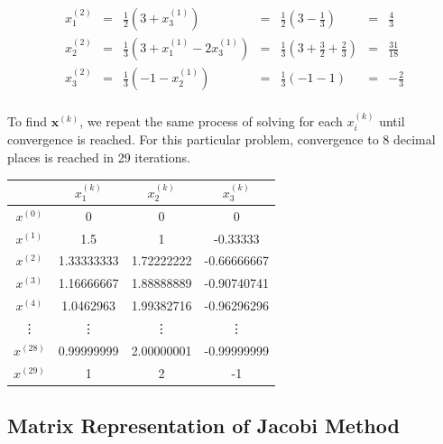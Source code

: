 $$
\begin{matrix}
x^{(2)}_1 & = & \frac{1}{2} ( 3 + x^{(1)}_3)  & = & \frac{1}{2} (3 - \frac{1}{3})     & = & \frac{4}{3} \\
x^{(2)}_2 & = & \frac{1}{3} ( 3 + x^{(1)}_1 - 2x^{(1)}_3) & = & \frac{1}{3} (3 + \frac{3}{2} + \frac{2}{3}) & = &  \frac{31}{18} \\
x^{(2)}_3 & = & \frac{1}{3} ( -1 - x^{(1)}_2)       & = & \frac{1}{3} (-1 - 1)    & = & -\frac{2}{3} \\
\end{matrix}
$$

To find $\mathbf{x}^{(k)}$, we repeat the same process of solving for each
$x^{(k)}_i$ until convergence is reached. For this particular problem,
convergence to 8 decimal places is reached in 29 iterations.

\begin{center}
\begin{tabular}{ c|c c c  }
          & $x^{(k)}_1$ & $x^{(k)}_2$ & $x^{(k)}_3$ \\
    \hline
    $x^{(0)}$ & 0 & 0 & 0 \\
    $x^{(1)}$ & 1.5 & 1 & -0.33333 \\
    $x^{(2)}$ & 1.33333333 & 1.72222222 & -0.66666667 \\
    $x^{(3)}$ & 1.16666667 & 1.88888889 & -0.90740741 \\
    $x^{(4)}$ & 1.0462963 & 1.99382716 & -0.96296296 \\
    \vdots    & \vdots    & \vdots     & \vdots     \\
    $x^{(28)}$ & 0.99999999 & 2.00000001 & -0.99999999 \\
    $x^{(29)}$ & 1 & 2 & -1 \\
\end{tabular}
\end{center}


\subsection*{Matrix Representation of Jacobi Method} %

